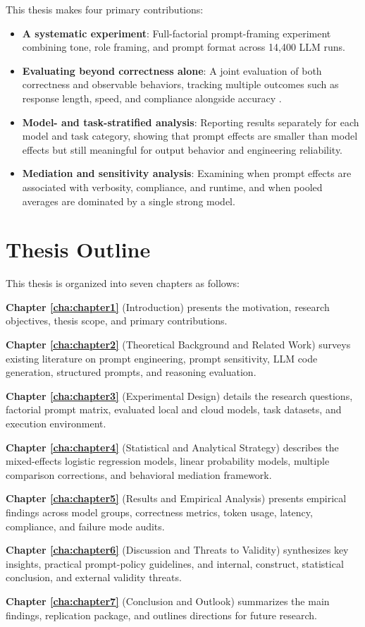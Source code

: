This thesis makes four primary contributions:
\begin{itemize}
\tightlist
\item \textbf{A systematic experiment}: Full-factorial prompt-framing experiment combining tone, role framing, and prompt format across 14,400 LLM runs.
\item \textbf{Evaluating beyond correctness alone}: A joint evaluation of both correctness and observable behaviors, tracking multiple outcomes such as response length, speed, and compliance alongside accuracy \cite{liang2023helm}.
\item \textbf{Model- and task-stratified analysis}: Reporting results separately for each model and task category, showing that prompt effects are smaller than model effects but still meaningful for output behavior and engineering reliability.
\item \textbf{Mediation and sensitivity analysis}: Examining when prompt effects are associated with verbosity, compliance, and runtime, and when pooled averages are dominated by a single strong model.
\end{itemize}

\section{Thesis Outline\label{sec:outline}}

This thesis is organized into seven chapters as follows:

\textbf{Chapter \ref{cha:chapter1}} (Introduction) presents the motivation, research objectives, thesis scope, and primary contributions.

\textbf{Chapter \ref{cha:chapter2}} (Theoretical Background and Related Work) surveys existing literature on prompt engineering, prompt sensitivity, LLM code generation, structured prompts, and reasoning evaluation.

\textbf{Chapter \ref{cha:chapter3}} (Experimental Design) details the research questions, factorial prompt matrix, evaluated local and cloud models, task datasets, and execution environment.

\textbf{Chapter \ref{cha:chapter4}} (Statistical and Analytical Strategy) describes the mixed-effects logistic regression models, linear probability models, multiple comparison corrections, and behavioral mediation framework.

\textbf{Chapter \ref{cha:chapter5}} (Results and Empirical Analysis) presents empirical findings across model groups, correctness metrics, token usage, latency, compliance, and failure mode audits.

\textbf{Chapter \ref{cha:chapter6}} (Discussion and Threats to Validity) synthesizes key insights, practical prompt-policy guidelines, and internal, construct, statistical conclusion, and external validity threats.

\textbf{Chapter \ref{cha:chapter7}} (Conclusion and Outlook) summarizes the main findings, replication package, and outlines directions for future research.
